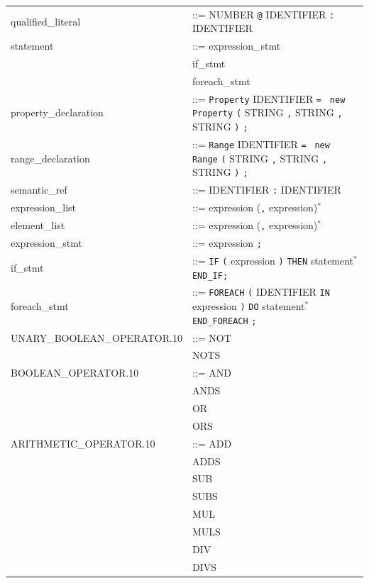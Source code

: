 \begin{longtable}{
>{\ttfamily\small}p{}
>{\raggedright\arraybackslash\small}p{}
}
qualified\_literal & ::= NUMBER \texttt{@} IDENTIFIER \texttt{:} IDENTIFIER\\

statement & ::= expression_stmt\\
& \textbar{} if_stmt\\
& \textbar{} foreach_stmt\\

property\_declaration & ::= \texttt{Property} IDENTIFIER \texttt{= }  \texttt{new} \texttt{Property} \texttt{(} STRING \texttt{,} STRING \texttt{,} STRING \texttt{)} \texttt{;}\\

range\_declaration & ::= \texttt{Range} IDENTIFIER \texttt{= }  \texttt{new} \texttt{Range} \texttt{(} STRING \texttt{,} STRING \texttt{,} STRING \texttt{)} \texttt{;}\\

semantic\_ref & ::= IDENTIFIER \texttt{:} IDENTIFIER\\

expression\_list & ::= expression (\texttt{,} expression)$^{*}$\\

element\_list & ::= expression (\texttt{,} expression)$^{*}$\\

expression\_stmt & ::= expression \texttt{;}\\

if\_stmt & ::= \texttt{IF} \texttt{(} expression \texttt{)} \texttt{THEN} statement$^{*}$\texttt{END\_IF}\texttt{;}\\

foreach\_stmt & ::= \texttt{FOREACH} \texttt{(} IDENTIFIER \texttt{IN} expression \texttt{)} \texttt{DO} statement$^{*}$ \texttt{END\_FOREACH} \texttt{;}\\

UNARY\_BOOLEAN\_OPERATOR.10 & ::= NOT\\
& \textbar{} NOTS\\

BOOLEAN\_OPERATOR.10 & ::= AND\\
& \textbar{} ANDS\\
& \textbar{} OR\\
& \textbar{} ORS\\

ARITHMETIC\_OPERATOR.10 & ::= ADD\\
& \textbar{} ADDS\\
& \textbar{} SUB\\
& \textbar{} SUBS\\
& \textbar{} MUL\\
& \textbar{} MULS\\
& \textbar{} DIV\\
& \textbar{} DIVS\\


\end{longtable}

